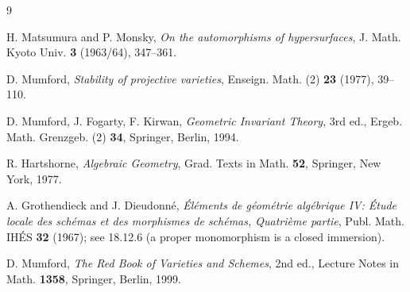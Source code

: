 \documentclass{amsart}
\theoremstyle{definition}
\begin{document}
\begin{thebibliography}{9}

 H. Matsumura and P. Monsky,
\emph{On the automorphisms of hypersurfaces}, J. Math. Kyoto Univ. \textbf{3} (1963/64),
347--361.

 D. Mumford,
\emph{Stability of projective varieties}, Enseign. Math. (2) \textbf{23} (1977), 39--110.

 D. Mumford, J. Fogarty, F. Kirwan,
\emph{Geometric Invariant Theory}, 3rd ed., Ergeb. Math. Grenzgeb. (2) \textbf{34},
Springer, Berlin, 1994.

 R. Hartshorne,
\emph{Algebraic Geometry}, Grad. Texts in Math. \textbf{52}, Springer, New York, 1977.

 A. Grothendieck and J. Dieudonn\'e,
\emph{\'El\'ements de g\'eom\'etrie alg\'ebrique IV: \'Etude locale des sch\'emas et des
morphismes de sch\'emas, Quatri\`eme partie}, Publ. Math. IHÉS \textbf{32} (1967); see
18.12.6 (a proper monomorphism is a closed immersion).

 D. Mumford,
\emph{The Red Book of Varieties and Schemes}, 2nd ed., Lecture Notes in Math. \textbf{1358},
Springer, Berlin, 1999.

\end{thebibliography}
\end{document}
